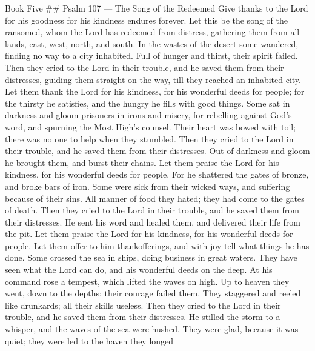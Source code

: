 Book Five \#\# Psalm 107 --- The Song of the Redeemed  Give
thanks to the Lord for his goodness for his kindness endures forever.
 Let this be the song of the ransomed, whom the Lord has
redeemed from distress,  gathering them from all lands,
east, west, north, and south.  In the wastes of the desert
some wandered, finding no way to a city inhabited.  Full of
hunger and thirst, their spirit failed.  Then they cried to
the Lord in their trouble, and he saved them from their distresses,
 guiding them straight on the way, till they reached an
inhabited city.  Let them thank the Lord for his kindness,
for his wonderful deeds for people;  for the thirsty he
satisfies, and the hungry he fills with good things.  Some
sat in darkness and gloom prisoners in irons and misery, 
for rebelling against God's word, and spurning the Most High's counsel.
 Their heart was bowed with toil; there was no one to help
when they stumbled.  Then they cried to the Lord in their
trouble, and he saved them from their distresses.  Out of
darkness and gloom he brought them, and burst their chains.
 Let them praise the Lord for his kindness, for his
wonderful deeds for people.  For he shattered the gates of
bronze, and broke bars of iron.  Some were sick from their
wicked ways, and suffering because of their sins.  All
manner of food they hated; they had come to the gates of death.
 Then they cried to the Lord in their trouble, and he saved
them from their distresses.  He sent his word and healed
them, and delivered their life from the pit.  Let them
praise the Lord for his kindness, for his wonderful deeds for people.
 Let them offer to him thankofferings, and with joy tell
what things he has done.  Some crossed the sea in ships,
doing business in great waters.  They have seen what the
Lord can do, and his wonderful deeds on the deep.  At his
command rose a tempest, which lifted the waves on high.  Up
to heaven they went, down to the depths; their courage failed them.
 They staggered and reeled like drunkards; all their skills
useless.  Then they cried to the Lord in their trouble, and
he saved them from their distresses.  He stilled the storm
to a whisper, and the waves of the sea were hushed.  They
were glad, because it was quiet; they were led to the haven they longed
